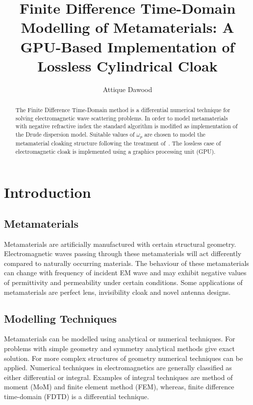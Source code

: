 \documentclass{report}
\begin{document}
\title{Finite Difference Time-Domain Modelling of Metamaterials: A GPU-Based Implementation of Lossless Cylindrical Cloak}
\author{Attique Dawood}
\maketitle

\tableofcontents
\listoffigures

\begin{abstract}
The Finite Difference Time-Domain method is a differential numerical technique for solving electromagnetic wave scattering problems. In order to model metamaterials with negative refractive index the standard algorithm is modified as implementation of the Drude dispersion model. Suitable values of $\omega_p$  are chosen to model the metamaterial cloaking structure following the treatment of~\cite{Radial-Zhao}. The lossless case of electromagnetic cloak is implemented using a graphics processing unit (GPU).
\end{abstract}

\chapter{Introduction}
\section{Metamaterials}
Metamaterials are artificially manufactured with certain structural geometry. Electromagnetic waves passing through these metamaterials will act differently compared to naturally occurring materials. The behaviour of these metamaterials can change with frequency of incident EM wave and may exhibit negative values of permittivity and permeability under certain conditions. Some applications of metamaterials are perfect lens, invisibility cloak and novel antenna designs.

\section{Modelling Techniques}
Metamaterials can be modelled using analytical or numerical techniques. For problems with simple geometry and symmetry analytical methods give exact solution. For more complex structures of geometry numerical techniques can be applied. Numerical techniques in electromagnetics are generally classified as either differential or integral. Examples of integral techniques are method of moment (MoM) and finite element method (FEM), whereas, finite difference time-domain (FDTD) is a differential technique.
\end{document}
